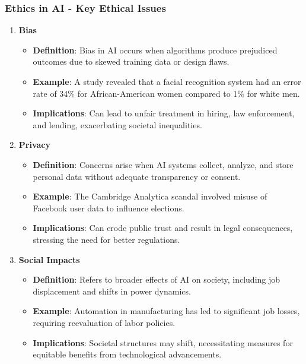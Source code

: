 \documentclass[aspectratio=169]{beamer}
\begin{document}
\begin{frame}[fragile]
    \frametitle{Ethics in AI - Key Ethical Issues}
    \begin{enumerate}
        \item \textbf{Bias}
            \begin{itemize}
                \item \textbf{Definition}: Bias in AI occurs when algorithms produce prejudiced outcomes due to skewed training data or design flaws.
                \item \textbf{Example}: A study revealed that a facial recognition system had an error rate of 34\% for African-American women compared to 1\% for white men.
                \item \textbf{Implications}: Can lead to unfair treatment in hiring, law enforcement, and lending, exacerbating societal inequalities.
            \end{itemize}
        \item \textbf{Privacy}
            \begin{itemize}
                \item \textbf{Definition}: Concerns arise when AI systems collect, analyze, and store personal data without adequate transparency or consent.
                \item \textbf{Example}: The Cambridge Analytica scandal involved misuse of Facebook user data to influence elections.
                \item \textbf{Implications}: Can erode public trust and result in legal consequences, stressing the need for better regulations.
            \end{itemize}
        \item \textbf{Social Impacts}
            \begin{itemize}
                \item \textbf{Definition}: Refers to broader effects of AI on society, including job displacement and shifts in power dynamics.
                \item \textbf{Example}: Automation in manufacturing has led to significant job losses, requiring reevaluation of labor policies.
                \item \textbf{Implications}: Societal structures may shift, necessitating measures for equitable benefits from technological advancements.
            \end{itemize}
    \end{enumerate}
\end{frame}
\end{document}
